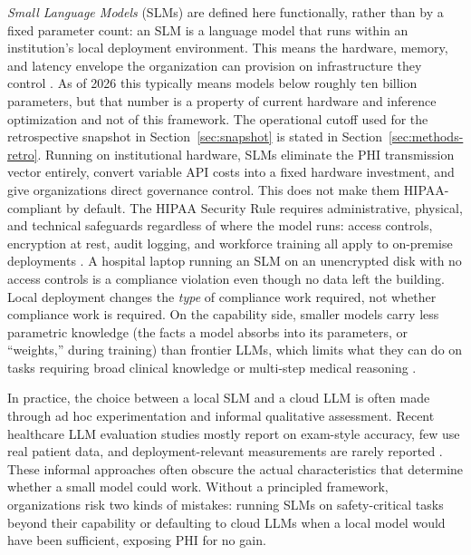 \documentclass[11pt]{article}
\begin{document}
\textit{Small Language Models} (SLMs) are defined here functionally, rather than by a fixed parameter count: an SLM is a language model that runs within an institution's local deployment environment. This means the hardware, memory, and latency envelope the organization can provision on infrastructure they control \cite{Zhang2024TinyLlama, Liu2024Mobile}. As of 2026 this typically means models below roughly ten billion parameters, but that number is a property of current hardware and inference optimization and not of this framework. The operational cutoff used for the retrospective snapshot in Section~\ref{sec:snapshot} is stated in Section~\ref{sec:methods-retro}. Running on institutional hardware, SLMs eliminate the PHI transmission vector entirely, convert variable API costs into a fixed hardware investment, and give organizations direct governance control. This does not make them HIPAA-compliant by default. The HIPAA Security Rule \cite{HHS2013SecurityRule} requires administrative, physical, and technical safeguards regardless of where the model runs: access controls, encryption at rest, audit logging, and workforce training all apply to on-premise deployments \cite{Marks2023HIPAAAI}. A hospital laptop running an SLM on an unencrypted disk with no access controls is a compliance violation even though no data left the building. Local deployment changes the \emph{type} of compliance work required, not whether compliance work is required. On the capability side, smaller models carry less parametric knowledge (the facts a model absorbs into its parameters, or ``weights,'' during training) than frontier LLMs, which limits what they can do on tasks requiring broad clinical knowledge or multi-step medical reasoning \cite{Li2023TextbooksII}.

In practice, the choice between a local SLM and a cloud LLM is often made through ad hoc experimentation and informal qualitative assessment. Recent healthcare LLM evaluation studies mostly report on exam-style accuracy, few use real patient data, and deployment-relevant measurements are rarely reported \cite{Shah2023, Bedi2025}. These informal approaches often obscure the actual characteristics that determine whether a small model could work. Without a principled framework, organizations risk two kinds of mistakes: running SLMs on safety-critical tasks beyond their capability or defaulting to cloud LLMs when a local model would have been sufficient, exposing PHI for no gain.
\end{document}
